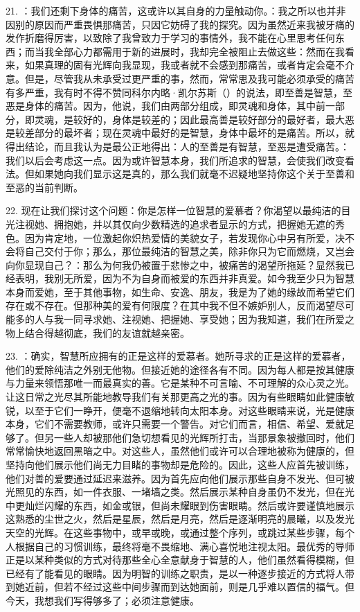 21. ：我们还剩下身体的痛苦，这或许以其自身的力量触动你。：我之所以也并非因别的原因而严重畏惧那痛苦，只因它妨碍了我的探究。因为虽然近来我被牙痛的发作折磨得厉害，以致除了我曾致力于学习的事情外，我不能在心里思考任何东西；而当我全部心力都需用于新的进展时，我却完全被阻止去做这些：然而在我看来，如果真理的固有光辉向我显现，我或者就不会感到那痛苦，或者肯定会毫不介意。但是，尽管我从未承受过更严重的事，然而，常常思及我可能必须承受的痛苦有多严重，我有时不得不赞同科尔内略·凯尔苏斯（）的说法，即至善是智慧，至恶是身体的痛苦。因为，他说，我们由两部分组成，即灵魂和身体，其中前一部分，即灵魂，是较好的，身体是较差的；因此最高善是较好部分的最好者，最大恶是较差部分的最坏者；现在灵魂中最好的是智慧，身体中最坏的是痛苦。所以，就得出结论，而且我认为是最公正地得出：人的至善是有智慧，至恶是遭受痛苦。：我们以后会考虑这一点。因为或许智慧本身，我们所追求的智慧，会使我们改变看法。但如果她向我们显示这是真的，那么我们就毫不迟疑地坚持你这个关于至善和至恶的当前判断。\par

22. 现在让我们探讨这个问题：你是怎样一位智慧的爱慕者？你渴望以最纯洁的目光注视她、拥抱她，并以其仅向少数精选的追求者显示的方式，把握她无遮的秀色。因为肯定地，一位激起你炽热爱情的美貌女子，若发现你心中另有所爱，决不会将自己交付于你；那么，那位最纯洁的智慧之美，除非你只为它而燃烧，又岂会向你显现自己？：那么为何我仍被置于悲惨之中，被痛苦的渴望所拖延？显然我已经表明，我别无所爱，因为不为自身而被爱的东西并非真爱。如今我至少只为智慧本身而爱她，至于其他事物，如生命、安逸、朋友，我是为了她的缘故而希望它们存在或不存在。但那种美的爱有何限度？在其中我不但不嫉妒别人，反而渴望尽可能多的人与我一同寻求她、注视她、把握她、享受她；因为我知道，我们在所爱之物上结合得越彻底，我们的友谊就越亲密。\par

23. ：确实，智慧所应拥有的正是这样的爱慕者。她所寻求的正是这样的爱慕者，他们的爱除纯洁之外别无他物。但接近她的途径各有不同。因为每人都是按其健康与力量来领悟那唯一而最真实的善。它是某种不可言喻、不可理解的众心灵之光。让这日常之光尽其所能地教导我们有关那更高之光的事。因为有些眼睛如此健康敏锐，以至于它们一睁开，便毫不退缩地转向太阳本身。对这些眼睛来说，光是健康本身，它们不需要教师，或许只需要一个警告。对它们而言，相信、希望、爱就足够了。但另一些人却被那他们急切想看见的光辉所打击，当那景象被撤回时，他们常常愉快地返回黑暗之中。对这些人，虽然他们或许可以合理地被称为健康的，但坚持向他们展示他们尚无力目睹的事物却是危险的。因此，这些人应首先被训练，他们对善的爱要通过延迟来滋养。因为首先应向他们展示那些自身不发光、但可被光照见的东西，如一件衣服、一堵墙之类。然后展示某种自身虽仍不发光，但在光中更灿烂闪耀的东西，如金或银，但尚未耀眼到伤害眼睛。然后或许要谨慎地展示这熟悉的尘世之火，然后是星辰，然后是月亮，然后是逐渐明亮的晨曦，以及发光天空的光辉。在这些事物中，或早或晚，或通过整个序列，或跳过某些步骤，每个人根据自己的习惯训练，最终将毫不畏缩地、满心喜悦地注视太阳。最优秀的导师正是以某种类似的方式对待那些全心全意献身于智慧的人，他们虽然看得模糊，但已经有了能看见的眼睛。因为明智的训练之职责，是以一种逐步接近的方式将人带到她近前，但若不经过这些中间步骤而到达她面前，则是几乎难以置信的福气。但今天，我想我们写得够多了；必须注意健康。\par

